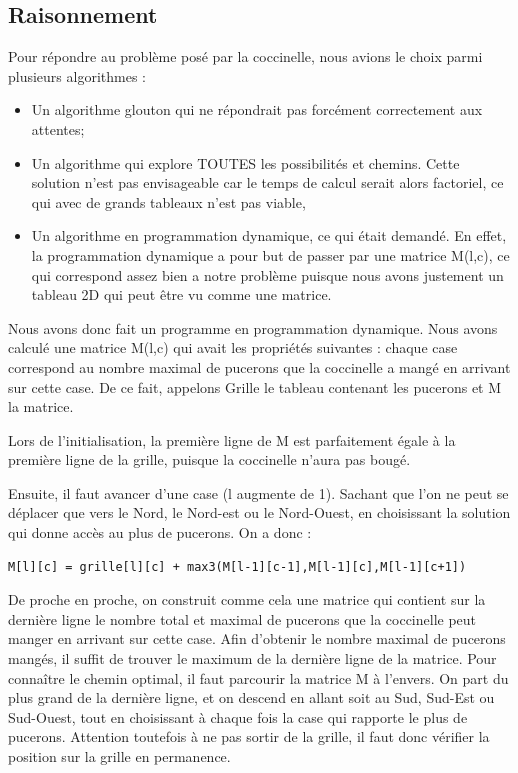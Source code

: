 \documentclass[12pt]{article}
\begin{document}
\subsection{Raisonnement}
Pour répondre au problème posé par la coccinelle, nous avions le choix parmi plusieurs algorithmes :
\begin{itemize}
    \item Un algorithme glouton qui ne répondrait pas forcément correctement aux attentes;

    \item Un algorithme qui explore TOUTES les possibilités et chemins. Cette solution n'est pas envisageable car le temps de calcul serait alors factoriel, ce qui avec de grands tableaux n'est pas viable,

    \item Un algorithme en programmation dynamique, ce qui était demandé. En effet, la programmation dynamique a pour but de passer par une matrice M(l,c), ce qui correspond assez bien a notre problème puisque nous avons justement un tableau 2D qui peut être vu comme une matrice.
\end{itemize}

Nous avons donc fait un programme en programmation dynamique. Nous avons calculé une matrice M(l,c) qui avait les propriétés suivantes : chaque case correspond au nombre maximal de pucerons que la coccinelle a mangé en arrivant sur cette case. De ce fait, appelons Grille le tableau contenant les pucerons et M la matrice.

Lors de l'initialisation, la première ligne de M est parfaitement égale à la première ligne de la grille, puisque la coccinelle n'aura pas bougé.

Ensuite, il faut avancer d'une case (l augmente de 1). Sachant que l'on ne peut se déplacer que vers le Nord, le Nord-est ou le Nord-Ouest, en choisissant la solution qui donne accès au plus de pucerons. \newline
On a donc :

\begin{lstlisting}
M[l][c] = grille[l][c] + max3(M[l-1][c-1],M[l-1][c],M[l-1][c+1])
\end{lstlisting}

\newpage
De proche en proche, on construit comme cela une matrice qui contient sur la dernière ligne le nombre total et maximal de pucerons que la coccinelle peut manger en arrivant sur cette case.
\newline Afin d'obtenir le nombre maximal de pucerons mangés, il suffit de trouver le maximum de la dernière ligne de la matrice.
\newline Pour connaître le chemin optimal, il faut parcourir la matrice M à l'envers. On part du plus grand de la dernière ligne, et on descend en allant soit au Sud, Sud-Est ou Sud-Ouest, tout en choisissant à chaque fois la case qui rapporte le plus de pucerons.
\newline Attention toutefois à ne pas sortir de la grille, il faut donc vérifier la position sur la grille en permanence.
\end{document}
